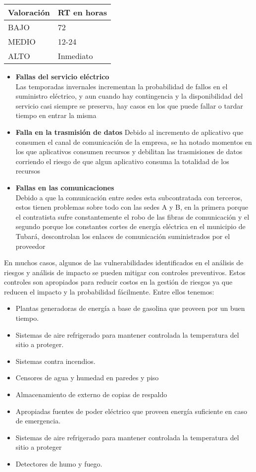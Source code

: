 \documentclass[conference]{IEEEtran}
\begin{document}
\begin{table}[h!]
\begin{tabular}{|l|l|}
\hline
\textbf{Valoración} & RT en horas \\ \hline
BAJO                & 72          \\ \hline
MEDIO               & 12-24       \\ \hline
ALTO                & Inmediato   \\ \hline
\end{tabular}
\end{table}

\begin{itemize}
    \item \textbf{Fallas del servicio eléctrico}\\
    Las temporadas invernales incrementan la probabilidad de fallos en el suministro eléctrico, y aun cuando hay contingencia y la disponibilidad del servicio casi siempre se preserva, hay casos en los que puede fallar o tardar tiempo en entrar la misma
    \item \textbf{Falla en la trasmisión de datos}
    Debido al incremento de
aplicativo que consumen el
canal de comunicación de la
empresa, se ha notado
momentos en los que
aplicativos consumen recursos
y debilitan las trasmisiones de
datos corriendo el riesgo de
que algun aplicativo consuma
la totalidad de los recursos
    \item \textbf{Fallas en las comunicaciones}\\
    Debido a que la
comunicación entre sedes
esta subcontratada con
terceros, estos tienen
problemas sobre todo con las
sedes A y B, en la primera
porque el contratista sufre
constantemente el robo de las
fibras de comunicación y el
segundo porque los
constantes cortes de energía
eléctrica en el municipio
de Tubará, descontrolan los
enlaces de comunicación
suministrados por el proveedor
\end{itemize}


En muchos casos, algunos de las vulnerabilidades identificados en el análisis
de riesgos y análisis de impacto se pueden mitigar con controles preventivos.
Estos controles son apropiados para reducir costos en la gestión de riesgos
ya que reducen el impacto y la probabilidad fácilmente. 
Entre ellos tenemos:
\begin{itemize}
    \item Plantas generadoras de energía a base de gasolina que proveen por
un buen tiempo.
\item Sistemas de aire refrigerado para mantener controlada la
temperatura del sitio a proteger.
\item Sistemas contra incendios.
\item Censores de agua y humedad en paredes y piso
\item Almacenamiento de externo de copias de respaldo
\item Apropiadas fuentes de poder eléctrico que proveen energía
suficiente en caso de emergencia.
\item Sistemas de aire refrigerado para mantener controlada la
temperatura del sitio a proteger
\item Detectores de humo y fuego.
\end{itemize}
\end{document}
